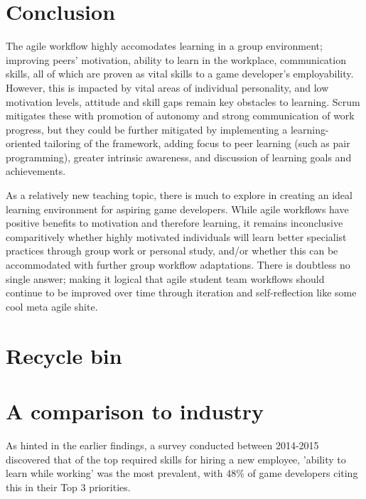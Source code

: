 \documentclass{scrartcl}
\begin{document}
\section{Conclusion}
The agile workflow highly accomodates learning in a group environment; improving peers' motivation, ability to learn in the workplace, communication skills, all of which are proven as vital skills to a game developer's employability. However, this is impacted by vital areas of individual personality, and low motivation levels, attitude and skill gaps remain key obstacles to learning. Scrum mitigates these with promotion of autonomy and strong communication of work progress, but they could be further mitigated by implementing a learning-oriented tailoring of the framework, adding focus to peer learning (such as pair programming), greater intrinsic awareness, and discussion of learning goals and achievements.

As a relatively new teaching topic, there is much to explore in creating an ideal learning environment for aspiring game developers. While agile workflows have positive benefits to motivation and therefore learning, it remains inconclusive comparitively whether highly motivated individuals will learn better specialist practices through group work or personal study, and/or whether this can be accommodated with further group workflow adaptations. There is doubtless no single answer; making it logical that agile student team workflows should continue to be improved over time through iteration and self-reflection like some cool meta agile shite.


\section{Recycle bin}
\section{A comparison to industry}
As hinted in the earlier findings, a survey conducted between 2014-2015 discovered that of the top required skills for hiring a new employee, 'ability to learn while working' \cite{devstudy} was the most prevalent, with 48\% of game developers citing this in their Top 3 priorities.

\end{document}
